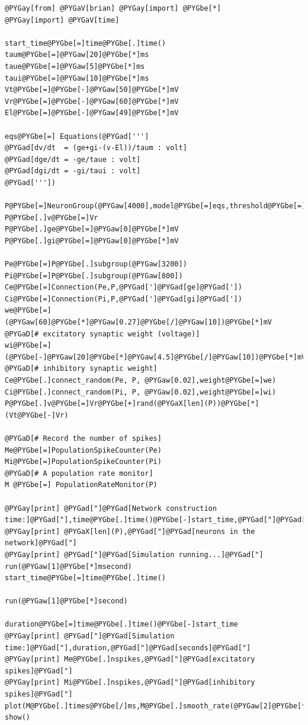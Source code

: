 \documentclass[letterpaper,10pt]{manual}
\begin{document}
\begin{Verbatim}[commandchars=@\[\]]
@PYGay[from] @PYGaV[brian] @PYGay[import] @PYGbe[*]
@PYGay[import] @PYGaV[time]

start_time@PYGbe[=]time@PYGbe[.]time()
taum@PYGbe[=]@PYGaw[20]@PYGbe[*]ms
taue@PYGbe[=]@PYGaw[5]@PYGbe[*]ms
taui@PYGbe[=]@PYGaw[10]@PYGbe[*]ms
Vt@PYGbe[=]@PYGbe[-]@PYGaw[50]@PYGbe[*]mV
Vr@PYGbe[=]@PYGbe[-]@PYGaw[60]@PYGbe[*]mV
El@PYGbe[=]@PYGbe[-]@PYGaw[49]@PYGbe[*]mV

eqs@PYGbe[=] Equations(@PYGad[''']
@PYGad[dv/dt  = (ge+gi-(v-El))/taum : volt]
@PYGad[dge/dt = -ge/taue : volt]
@PYGad[dgi/dt = -gi/taui : volt]
@PYGad['''])

P@PYGbe[=]NeuronGroup(@PYGaw[4000],model@PYGbe[=]eqs,threshold@PYGbe[=]Vt,reset@PYGbe[=]Vr,refractory@PYGbe[=]@PYGaw[5]@PYGbe[*]ms)
P@PYGbe[.]v@PYGbe[=]Vr
P@PYGbe[.]ge@PYGbe[=]@PYGaw[0]@PYGbe[*]mV
P@PYGbe[.]gi@PYGbe[=]@PYGaw[0]@PYGbe[*]mV

Pe@PYGbe[=]P@PYGbe[.]subgroup(@PYGaw[3200])
Pi@PYGbe[=]P@PYGbe[.]subgroup(@PYGaw[800])
Ce@PYGbe[=]Connection(Pe,P,@PYGad[']@PYGad[ge]@PYGad['])
Ci@PYGbe[=]Connection(Pi,P,@PYGad[']@PYGad[gi]@PYGad['])
we@PYGbe[=](@PYGaw[60]@PYGbe[*]@PYGaw[0.27]@PYGbe[/]@PYGaw[10])@PYGbe[*]mV @PYGaD[# excitatory synaptic weight (voltage)]
wi@PYGbe[=](@PYGbe[-]@PYGaw[20]@PYGbe[*]@PYGaw[4.5]@PYGbe[/]@PYGaw[10])@PYGbe[*]mV @PYGaD[# inhibitory synaptic weight]
Ce@PYGbe[.]connect_random(Pe, P, @PYGaw[0.02],weight@PYGbe[=]we)
Ci@PYGbe[.]connect_random(Pi, P, @PYGaw[0.02],weight@PYGbe[=]wi)
P@PYGbe[.]v@PYGbe[=]Vr@PYGbe[+]rand(@PYGaX[len](P))@PYGbe[*](Vt@PYGbe[-]Vr)

@PYGaD[# Record the number of spikes]
Me@PYGbe[=]PopulationSpikeCounter(Pe)
Mi@PYGbe[=]PopulationSpikeCounter(Pi)
@PYGaD[# A population rate monitor]
M @PYGbe[=] PopulationRateMonitor(P)

@PYGay[print] @PYGad["]@PYGad[Network construction time:]@PYGad["],time@PYGbe[.]time()@PYGbe[-]start_time,@PYGad["]@PYGad[seconds]@PYGad["]
@PYGay[print] @PYGaX[len](P),@PYGad["]@PYGad[neurons in the network]@PYGad["]
@PYGay[print] @PYGad["]@PYGad[Simulation running...]@PYGad["]
run(@PYGaw[1]@PYGbe[*]msecond)
start_time@PYGbe[=]time@PYGbe[.]time()

run(@PYGaw[1]@PYGbe[*]second)

duration@PYGbe[=]time@PYGbe[.]time()@PYGbe[-]start_time
@PYGay[print] @PYGad["]@PYGad[Simulation time:]@PYGad["],duration,@PYGad["]@PYGad[seconds]@PYGad["]
@PYGay[print] Me@PYGbe[.]nspikes,@PYGad["]@PYGad[excitatory spikes]@PYGad["]
@PYGay[print] Mi@PYGbe[.]nspikes,@PYGad["]@PYGad[inhibitory spikes]@PYGad["]
plot(M@PYGbe[.]times@PYGbe[/]ms,M@PYGbe[.]smooth_rate(@PYGaw[2]@PYGbe[*]ms,@PYGad[']@PYGad[gaussian]@PYGad[']))
show()
\end{Verbatim}
\end{document}
